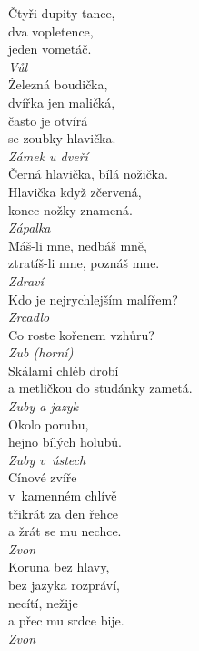 \begin{multicols}{3}
\noindent
Čtyři dupity tance,\\
dva vopletence,\\
jeden vometáč.\\[1 mm]
{\sl Vůl}\\

\noindent
Železná boudička,\\
dvířka jen maličká,\\
často je otvírá\\
se zoubky hlavička.\\[1 mm]
{\sl Zámek u dveří}\\

\noindent
Černá hlavička, bílá nožička.\\
Hlavička když zčervená,\\
konec nožky znamená.\\[1 mm]
{\sl Zápalka}\\

\noindent
Máš-li mne, nedbáš mně,\\
ztratíš-li mne, poznáš mne.\\[1 mm]
{\sl Zdraví}\\

\noindent
Kdo je nejrychlejším malířem?\\[1 mm]
{\sl Zrcadlo}\\

\noindent
Co roste kořenem vzhůru?\\[1 mm]
{\sl Zub (horní)}\\

\noindent
Skálami chléb drobí\\
a metličkou do studánky zametá.\\[1 mm]
{\sl Zuby a jazyk}\\

\noindent
Okolo porubu,\\
hejno bílých holubů.\\[1 mm]
{\sl Zuby v~ústech}\\

\noindent
Cínové zvíře\\
v~kamenném chlívě\\
třikrát za den řehce\\
a žrát se mu nechce.\\[1 mm]
{\sl Zvon}\\

\noindent
Koruna bez hlavy,\\
bez jazyka rozpráví,\\
necítí, nežije\\
a přec mu srdce bije.\\[1 mm]
{\sl Zvon}\\


\end{multicols}
